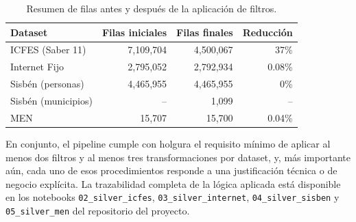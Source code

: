 \begin{table}[H]
\centering
\caption{Resumen de filas antes y después de la aplicación de filtros.}
\begin{tabular}{l r r r}
\toprule
\textbf{Dataset} & \textbf{Filas iniciales} & \textbf{Filas finales} & \textbf{Reducción} \\
\midrule
ICFES (Saber 11)     & 7,109,704 & 4,500,067 & 37\%   \\
Internet Fijo        & 2,795,052 & 2,792,934 & 0.08\% \\
Sisbén (personas)    & 4,465,955 & 4,465,955 & 0\%    \\
Sisbén (municipios)  & --        & 1,099     & --     \\
MEN                  & 15,707    & 15,700    & 0.04\% \\
\bottomrule
\end{tabular}
\end{table}

En conjunto, el pipeline cumple con holgura el requisito mínimo de aplicar al menos dos filtros y al menos tres transformaciones por dataset, y, más importante aún, cada uno de esos procedimientos responde a una justificación técnica o de negocio explícita. La trazabilidad completa de la lógica aplicada está disponible en los notebooks \texttt{02\_silver\_icfes}, \texttt{03\_silver\_internet}, \texttt{04\_silver\_sisben} y \texttt{05\_silver\_men} del repositorio del proyecto.
